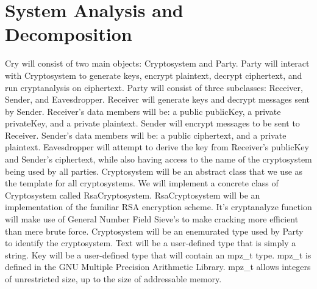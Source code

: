 \section{System Analysis and Decomposition}


Cry will consist of two main objects: Cryptosystem and
Party. Party will interact with Cryptosystem to generate
keys, encrypt plaintext, decrypt ciphertext, and run
cryptanalysis on ciphertext.
\medskip
Party will consist of three subclasses: Receiver, Sender,
and Eavesdropper. Receiver will generate keys and decrypt
messages sent by Sender. Receiver's data members will be:
a public publicKey, a private privateKey, and a private
plaintext. Sender will encrypt messages to be sent to
Receiver. Sender's data members will be: a public
ciphertext, and a private plaintext. Eavesdropper will
attempt to derive the key from Receiver's publicKey and
Sender's ciphertext, while also having access to the name
of the cryptosystem being used by all parties.
\medskip
Cryptosystem will be an abstract class that we use as the
template for all cryptosystems.
\medskip
We will implement a concrete class of Cryptosystem called
RsaCryptosystem. RsaCryptosystem will be an implementation
of the familiar RSA encryption scheme. It's cryptanalyze
function will make use of General Number Field Sieve's to
make cracking more efficient than mere brute force.
\medskip
Cryptosystem will be an enemurated type used by Party to
identify the cryptosystem.
\medskip
Text will be a user-defined type that is simply a string.
\medskip
Key will be a user-defined type that will contain an
mpz\_t type. mpz\_t is defined in the GNU Multiple Precision
Arithmetic Library. mpz\_t allows integers of unrestricted
size, up to the size of addressable memory.
